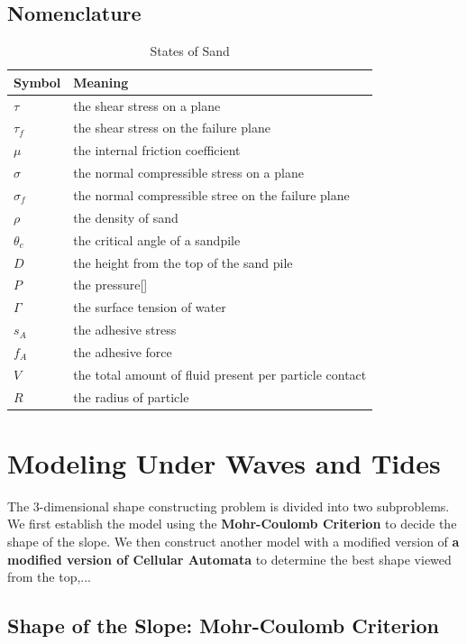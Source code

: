 \documentclass[12pt]{article}
\begin{document}
\subsection{Nomenclature}
\begin{table}[H]
	\caption{States of Sand}
	\vspace{5pt}
	\centering
	\begin{tabular}{p{3cm}p{12cm}}
		\hline
		Symbol & Meaning \\
		\hline
		$\tau$   & the shear stress on a plane \\
		$\tau_f$ & the shear stress on the failure plane\\
		$\mu$    & the internal friction coefficient \\
		$\sigma$ & the normal compressible stress on a plane \\
		$\sigma_f$ & the normal compressible stree on the failure plane \\
		$\rho$   & the density of sand \\ 
		$\theta_c$ & the critical angle of a sandpile\\
		$D$ & the height from the top of the sand pile \\
		$P$ & the pressure[] \\
		$\Gamma$ & the surface tension of water \\
		$s_A$ & the adhesive stress \\
		$f_A$ & the adhesive force \\
		$V$ & the total amount of fluid present per particle contact \\
		$R$ & the radius of particle \\
		\hline       
	\end{tabular}
	\label{bs2}
\end{table}


\section{Modeling Under Waves and Tides}

\par
The 3-dimensional shape constructing problem is divided into two subproblems. We first establish the model using the \textbf{Mohr-Coulomb Criterion} to decide the shape of the slope. We then construct another model with a modified version of \textbf{a modified version of Cellular Automata} to determine the best shape viewed from the top,...

\subsection{Shape of the Slope: Mohr-Coulomb Criterion}
\end{document}
